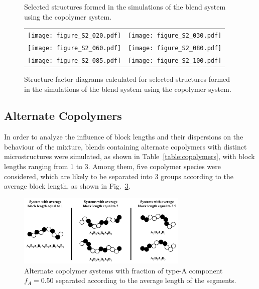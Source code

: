 \documentclass[
aip,
jcp,
reprint,
]{revtex4-1}
\begin{document}
\begin{figure}
\begin{tabular}{C{1.6in}@{}C{1.6in}}
	\end{tabular}
	\caption{Selected structures formed in the simulations of the blend system using the  copolymer system.}
	\label{fig:Figure_4}
\end{figure}

\begin{figure}
	\centering
	\begin{tabular}{C{1.6in}@{}C{1.6in}}
		\texttt{[image: figure\_S2\_020.pdf]} & \texttt{[image: figure\_S2\_030.pdf]} \\
		\texttt{[image: figure\_S2\_060.pdf]} & \texttt{[image: figure\_S2\_080.pdf]} \\		
		\texttt{[image: figure\_S2\_085.pdf]} & \texttt{[image: figure\_S2\_100.pdf]} \\		
	\end{tabular}
	\caption{Structure-factor diagrams calculated for selected structures formed in the simulations of the blend system using the  copolymer system.}
	\label{fig:Figure_5}
\end{figure}

\subsection{Alternate Copolymers}

In order to analyze the  influence of block lengths and their dispersions on the behaviour of the mixture, blends containing alternate copolymers with distinct microstructures were simulated, as shown in Table~\ref{table:copolymers}, with block lengths ranging from 1 to 3.
Among them, five copolymer species were considered, which are likely to be separated into 3 groups according to the average block length, as shown in Fig.~\ref{fig:Figure_6}. 

\begin{figure}
	\centering
	\includegraphics[width=3.2in]{figure6.png}
	\caption{Alternate copolymer systems with fraction of type-A component $f_A=0.50$  separated according to the average length of the segments.}
	\label{fig:Figure_6}
\end{figure}
\end{document}
